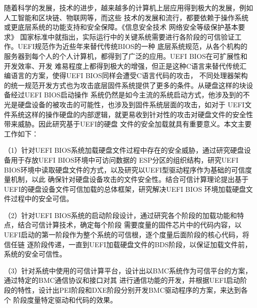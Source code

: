 \begin{cabstract}

随着科学的发展，技术的进步，越来越多的计算机上层应用得到极大的发展，例如人工智能和区块链、物联网等，而这些
技术的发展和流行，都要依赖于操作系统或更底层系统的功能支持和安全保障。《信息安全技术 网络安全等级保护基本要求》
国家标准中就指出，实际运行中的关键系统需要进行各阶段的可信验证工作。UEFI规范作为近些年来替代传统BIOS的一种
底层系统规范，从各个机构的服务器到每个人的个人计算机，都得到了广泛的应用。UEFI BIOS在可扩展性和开发效率、开发
难易程度上都得到极大的增强，但正是这种C语言来替代传统汇编语言的方案，使得UEFI BIOS同样会遭受C语言代码的攻击，
不同处理器架构的统一规范开发方式也为攻击底层固件系统提供了更多的条件。从硬盘这样的块设备经过UEFI BIOS启动操作
系统仍然是如今主流的系统启动方式，他涉及到的不光是硬盘设备的被攻击的可能性，也涉及到固件系统层面的攻击，如对于
UEFI文件系统这样的操作硬盘的内部逻辑，就更易收到针对性的攻击对硬盘文件的安全性带来威胁。因此研究基于UEFI的硬盘
文件的安全加载就具有重要意义。本文主要工作如下：
\par （1）针对UEFI BIOS系统加载硬盘文件过程中存在的安全威胁，通过研究硬盘设备用于存放UEFI BIOS环境中可访问数据的
ESP分区的组织结构，研究UEFI BIOS环境中读取硬盘文件的方式，以及研究以UEFI型驱动程序作为基础的可信度量机制，以此
确保针对硬盘设备攻击的文件安全性。结合可信计算理论提出基于UEFI的硬盘设备文件可信加载的总体框架，研究解决UEFI BIOS
环境加载硬盘文件过程中的安全可信。
\par （2）针对UEFI BIOS系统的启动阶段设计，通过研究各个阶段的加载功能和特点，结合可信计算技术，确定每个阶段
需要度量的固件芯片中的代码内容，以UEFI启动的第一阶段作为整个系统的可信根，逐个度量后面阶段的核心代码，将信任链
逐阶段传递，一直到UEFI加载硬盘文件的BDS阶段，以保证加载文件前，系统的安全可信性。
\par （3）针对系统中使用的可信计算平台，设计出以BMC系统作为可信平台的方案，通过特定的BMC通信协议和接口对其
进行通信功能的开发，并根据UEFI启动阶段的特性，设计出PEI阶段和DXE阶段分别开发BMC驱动程序的方案，来达到各个
阶段度量特定驱动和代码的效果。
\par 

\end{cabstract}


